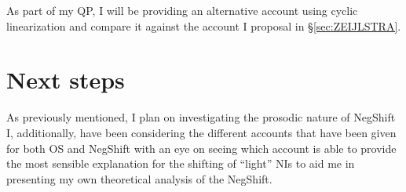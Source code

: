 \documentclass[12pt, letterpaper]{article}
\begin{document}
As part of my QP, I will be providing an alternative account using cyclic linearization and compare it against the account I proposal in §\ref{sec:ZEIJLSTRA}.





\section{Next steps} 

As previously mentioned, I plan on investigating the prosodic nature of NegShift I, additionally, have been considering the different accounts that have been given for both OS and NegShift with an eye on seeing which account is able to provide the most sensible explanation for the shifting of ``light'' NIs to aid me in presenting my own theoretical analysis of the NegShift.

\printbibliography[heading=bibintoc]
\end{document}
